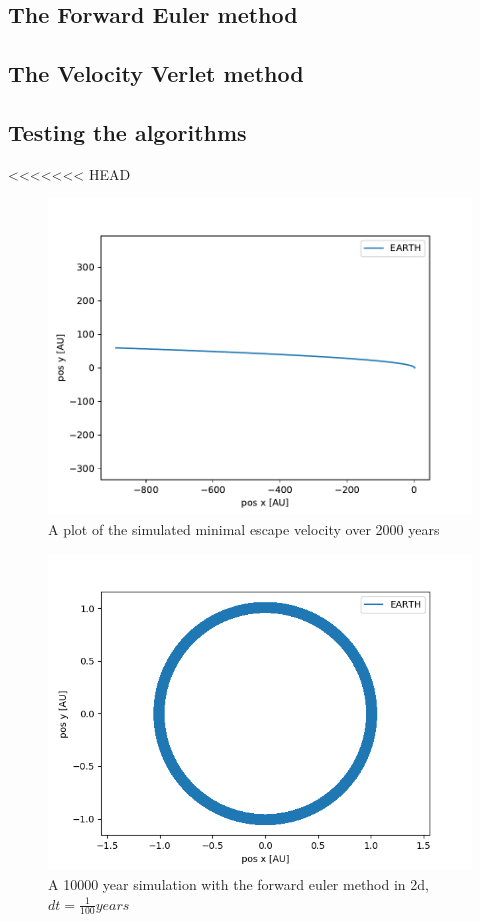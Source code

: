 \documentclass[a4paper]{article}
\begin{document}
\subsection{The Forward Euler method}

\subsection{The Velocity Verlet method}

\subsection{Testing the algorithms}
<<<<<<< HEAD
\begin{figure}[h!]
	\centering 
	\includegraphics[scale=0.7]{escapeVelocity2000.pdf}
	\caption{A plot of the simulated minimal escape velocity over 2000 years}
	\label{escape_vel}
\end{figure}
\begin{figure}[h!]
	\centering 
	\includegraphics[scale=0.7]{fe1e4_2d.png}
	\caption{A 10000 year simulation with the forward euler method in 2d, $dt = \frac{1}{100}years$}
	\label{escape_vel}
\end{figure}
\end{document}
